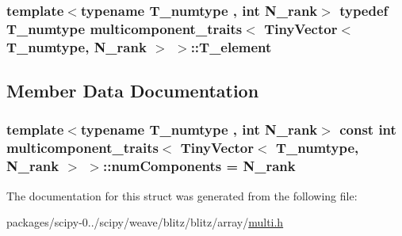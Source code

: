 \subsubsection[{T\+\_\+element}]{\setlength{\rightskip}{0pt plus 5cm}template$<$typename T\+\_\+numtype , int N\+\_\+rank$>$ typedef T\+\_\+numtype {\bf multicomponent\+\_\+traits}$<$ {\bf Tiny\+Vector}$<$ T\+\_\+numtype, N\+\_\+rank $>$ $>$\+::{\bf T\+\_\+element}}\label{structmulticomponent__traits_3_01TinyVector_3_01T__numtype_00_01N__rank_01_4_01_4_a07426ad661a9804207050bd7a443951c}


\subsection{Member Data Documentation}
\hypertarget{structmulticomponent__traits_3_01TinyVector_3_01T__numtype_00_01N__rank_01_4_01_4_acd0c3944c159c66aec3cf7536efc5ae2}{}
\subsubsection[{num\+Components}]{\setlength{\rightskip}{0pt plus 5cm}template$<$typename T\+\_\+numtype , int N\+\_\+rank$>$ const int {\bf multicomponent\+\_\+traits}$<$ {\bf Tiny\+Vector}$<$ T\+\_\+numtype, N\+\_\+rank $>$ $>$\+::num\+Components = N\+\_\+rank\hspace{0.3cm}{\ttfamily [static]}}\label{structmulticomponent__traits_3_01TinyVector_3_01T__numtype_00_01N__rank_01_4_01_4_acd0c3944c159c66aec3cf7536efc5ae2}


The documentation for this struct was generated from the following file\+:\begin{DoxyCompactItemize}
\item 
packages/scipy-\/0../scipy/weave/blitz/blitz/array/\hyperlink{multi_8h}{multi.\+h}\end{DoxyCompactItemize}
